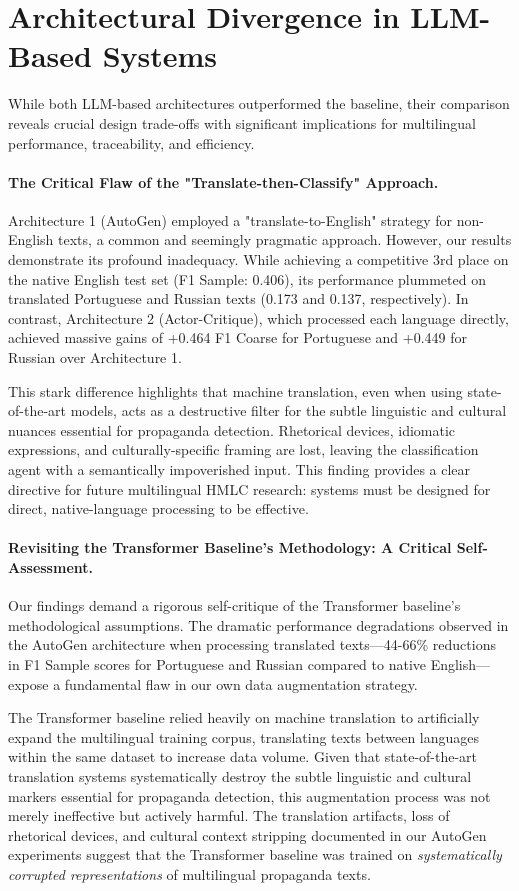 \section{Architectural Divergence in LLM-Based Systems}

While both LLM-based architectures outperformed the baseline, their comparison reveals crucial design trade-offs with significant implications for multilingual performance, traceability, and efficiency.

\paragraph{The Critical Flaw of the "Translate-then-Classify" Approach.}
Architecture 1 (AutoGen) employed a "translate-to-English" strategy for non-English texts, a common and seemingly pragmatic approach. However, our results demonstrate its profound inadequacy. While achieving a competitive 3rd place on the native English test set (F1 Sample: 0.406), its performance plummeted on translated Portuguese and Russian texts (0.173 and 0.137, respectively). In contrast, Architecture 2 (Actor-Critique), which processed each language directly, achieved massive gains of +0.464 F1 Coarse for Portuguese and +0.449 for Russian over Architecture 1.

This stark difference highlights that machine translation, even when using state-of-the-art models, acts as a destructive filter for the subtle linguistic and cultural nuances essential for propaganda detection. Rhetorical devices, idiomatic expressions, and culturally-specific framing are lost, leaving the classification agent with a semantically impoverished input. This finding provides a clear directive for future multilingual HMLC research: systems must be designed for direct, native-language processing to be effective.

\paragraph{Revisiting the Transformer Baseline's Methodology: A Critical Self-Assessment.}
Our findings demand a rigorous self-critique of the Transformer baseline's methodological assumptions. The dramatic performance degradations observed in the AutoGen architecture when processing translated texts—44-66\% reductions in F1 Sample scores for Portuguese and Russian compared to native English—expose a fundamental flaw in our own data augmentation strategy. 

The Transformer baseline relied heavily on machine translation to artificially expand the multilingual training corpus, translating texts between languages within the same dataset to increase data volume. Given that state-of-the-art translation systems systematically destroy the subtle linguistic and cultural markers essential for propaganda detection, this augmentation process was not merely ineffective but actively harmful. The translation artifacts, loss of rhetorical devices, and cultural context stripping documented in our AutoGen experiments suggest that the Transformer baseline was trained on \textit{systematically corrupted representations} of multilingual propaganda texts.


